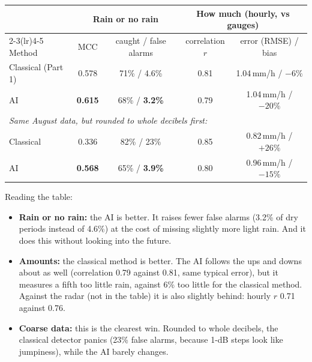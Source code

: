 \begin{center}\small
\begin{tabular}{lcccc}
\toprule
& \multicolumn{2}{c}{\textbf{Rain or no rain}} & \multicolumn{2}{c}{\textbf{How much (hourly, vs gauges)}}\\
\cmidrule(lr){2-3}\cmidrule(lr){4-5}
Method & MCC & caught / false alarms & correlation $r$ & error (RMSE) / bias\\
\midrule
Classical (Part 1) & 0.578 & 71\% / 4.6\% & 0.81 & 1.04\,mm/h / $-6\%$ \\
AI & \textbf{0.615} & 68\% / \textbf{3.2\%} & 0.79 & 1.04\,mm/h / $-20\%$ \\
\midrule
\multicolumn{5}{l}{\emph{Same August data, but rounded to whole decibels first:}}\\
Classical & 0.336 & 82\% / 23\% & 0.85 & 0.82\,mm/h / $+26\%$ \\
AI & \textbf{0.568} & 65\% / \textbf{3.9\%} & 0.80 & 0.96\,mm/h / \textbf{$-15\%$} \\
\bottomrule
\end{tabular}
\end{center}

Reading the table:
\begin{itemize}
\item \textbf{Rain or no rain:} the AI is better. It raises fewer false alarms (3.2\% of dry periods instead of
4.6\%) at the cost of missing slightly more light rain. And it does this without looking into the future.
\item \textbf{Amounts:} the classical method is better. The AI follows the ups and downs about as well (correlation 0.79
against 0.81, same typical error), but it measures a fifth too little rain, against 6\% too little for the classical
method. Against the radar (not in the table) it is also slightly behind: hourly $r$ 0.71 against 0.76.
\item \textbf{Coarse data:} this is the clearest win. Rounded to whole decibels, the classical detector panics (23\%
false alarms, because 1-dB steps look like jumpiness), while the AI barely changes.
\end{itemize}

